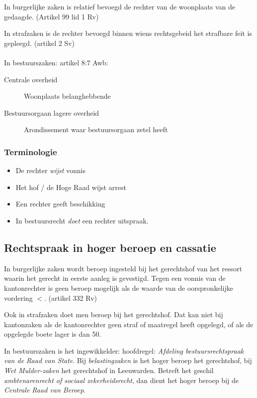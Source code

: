 \documentclass{article}
\begin{document}
In burgerlijke zaken is relatief bevoegd de rechter van de woonplaats van de
gedaagde. (Artikel 99 lid 1 Rv)

In strafzaken is de rechter bevoegd binnen wiens rechtsgebeid het strafbare
feit is gepleegd. (artikel 2 Sv)
\\\\
In bestuurszaken: artikel 8:7 Awb:
\begin{description}
  \item[Centrale overheid] Woonplaats belanghebbende
  \item[Bestuursorgaan lagere overheid] Arondissement waar bestuursorgaan zetel heeft
\end{description}

\subsubsection{Terminologie}
\begin{itemize}
  \item De rechter \emph{wijst} vonnis
  \item Het hof / de Hoge Raad wijst arrest
  \item Een rechter geeft beschikking
  \item In bestuursrecht \emph{doet} een rechter uitspraak.
\end{itemize}

\subsection{Rechtspraak in hoger beroep en cassatie}

In burgerlijke zaken wordt beroep ingesteld bij het gerechtshof van het ressort
waarin het gerecht in eerste aanleg is gevestigd. Tegen een vonnis van de
kantonrechter is geen beroep mogelijk als de waarde van de oorspronkelijke
vordering $<$. (artikel 332 Rv)

Ook in strafzaken doet men beroep bij het gerechtshof. Dat kan niet bij
kantonzaken als de kantonrechter geen straf of maatregel heeft opgelegd, of als
de opgelegde boete lager is dan 50.

In bestuurszaken is het ingewikkelder: hoofdregel: \emph{Afdeling
bestuursrechtspraak van de Raad van State}. Bij \emph{belastingzaken} is het
hoger beroep het gerechtshof, bij \emph{Wet Mulder-zaken} het gerechtshof in
Leeuwarden. Betreft het geschil \emph{ambtenarenrecht of sociaal
zekerheidsrecht}, dan dient het hoger beroep bij de \emph{Centrale Raad van
Beroep}.
\end{document}
